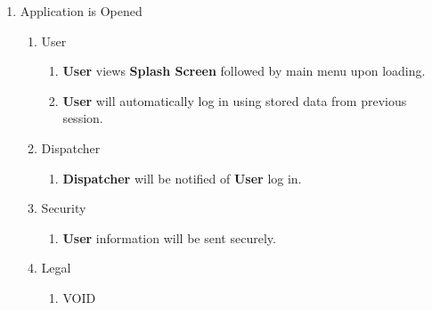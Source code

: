 \documentclass[english]{article}
\begin{document}
\begin{enumerate}[{BE}1.]
	\item Application is Opened
	\begin{enumerate}[{VP1}.1]
		\item User
			\begin{enumerate}
				\item \textbf{User} views \textbf{Splash Screen} followed by main menu upon loading.
				\item \textbf{User} will automatically log in using stored data from previous session.
			\end{enumerate}
		\item Dispatcher
			\begin{enumerate}
				\item \textbf{Dispatcher} will be notified of \textbf{User} log in. 
			\end{enumerate}
		\item Security
			\begin{enumerate}
			\item \textbf{User} information will be sent securely.
			\end{enumerate}
		\item Legal
			\begin{enumerate}
			\item VOID
			\end{enumerate}
	\end{enumerate}


\end{enumerate}
\end{document}
